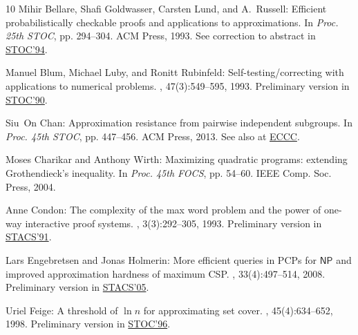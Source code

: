 \begin{thebibliography}{10}
{\sc Mihir Bellare, Shafi Goldwasser, Carsten Lund, and A.~Russell}: Efficient
  probabilistically checkable proofs and applications to approximations.
\newblock In {\em Proc. 25th STOC}, pp. 294--304. ACM Press, 1993.
\newblock See correction to abstract in
  \href{http://dx.doi.org/10.1145/195058.195467}{STOC'94}.
\newblock [\epfmtdoi{10.1145/167088.167174}]

{\sc Manuel Blum, Michael Luby, and Ronitt Rubinfeld}: Self-testing/correcting
  with applications to numerical problems.
, 47(3):549--595, 1993.
\newblock Preliminary version in
  \href{http://dx.doi.org/10.1145/100216.100225}{STOC'90}.
\newblock [\epfmtdoi{10.1016/0022-0000(93)90044-W}]

{\sc Siu~On Chan}: Approximation resistance from pairwise independent
  subgroups.
\newblock In {\em Proc. 45th STOC}, pp. 447--456. ACM Press, 2013.
\newblock See also at \href{http://eccc.hpi-web.de/report/2012/110/}{ECCC}.
\newblock [\epfmtdoi{10.1145/2488608.2488665}]

{\sc Moses Charikar and Anthony Wirth}: Maximizing quadratic programs:
  extending {G}rothendieck's inequality.
\newblock In {\em Proc. 45th FOCS}, pp. 54--60. IEEE Comp. Soc. Press, 2004.

{\sc Anne Condon}: The complexity of the max word problem and the power of
  one-way interactive proof systems.
, 3(3):292--305, 1993.
\newblock Preliminary version in
  \href{http://dx.doi.org/10.1007/BFb0020820}{STACS'91}.
\newblock [\epfmtdoi{10.1007/BF01271372}]

{\sc Lars Engebretsen and Jonas Holmerin}: More efficient queries in {PCPs} for
  $\mathsf{NP}$ and improved approximation hardness of maximum {CSP}.
, 33(4):497--514, 2008.
\newblock Preliminary version in
  \href{http://dx.doi.org/10.1007/978-3-540-31856-9_16}{STACS'05}.

{\sc Uriel Feige}: A threshold of $\ln n$ for approximating set cover.
, 45(4):634--652, 1998.
\newblock Preliminary version in
  \href{http://dx.doi.org/10.1145/237814.237977}{STOC'96}.
\newblock [\epfmtdoi{10.1145/285055.285059}]


\end{thebibliography}
